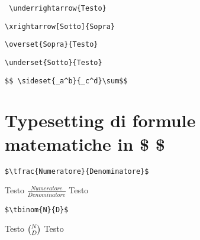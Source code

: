 \begin{center}
\begin{minipage}{.2\textwidth}
\end{minipage}
\begin{minipage}{.4\textwidth}
\begin{verbatim}
 \underrightarrow{Testo}
\end{verbatim}
\end{minipage}
\begin{minipage}{.2\textwidth}
\end{minipage}
\begin{minipage}{.4\textwidth}
\begin{verbatim}
\xrightarrow[Sotto]{Sopra}
\end{verbatim}
\end{minipage}
\begin{minipage}{.2\textwidth}
\end{minipage}
\begin{minipage}{.4\textwidth}
\begin{verbatim}
\overset{Sopra}{Testo}
\end{verbatim}
\end{minipage}
\begin{minipage}{.2\textwidth}
\end{minipage}
\begin{minipage}{.4\textwidth}
\begin{verbatim}
\underset{Sotto}{Testo}
\end{verbatim}
\end{minipage}
\begin{minipage}{.2\textwidth}
\end{minipage}
\begin{minipage}{.4\textwidth}
\begin{verbatim}
$$ \sideset{_a^b}{_c^d}\sum$$
\end{verbatim}
\end{minipage}
\begin{minipage}{.2\textwidth}
\vspace{1cm}
\end{minipage}
\end{center}
\section{Typesetting di formule matematiche in \$ \$}
\begin{verbatim}
$\tfrac{Numeratore}{Denominatore}$
\end{verbatim}
Testo $\tfrac{Numeratore}{Denominatore}$ Testo

\begin{verbatim}
$\tbinom{N}{D}$
\end{verbatim}
Testo $\tbinom{N}{D}$ Testo